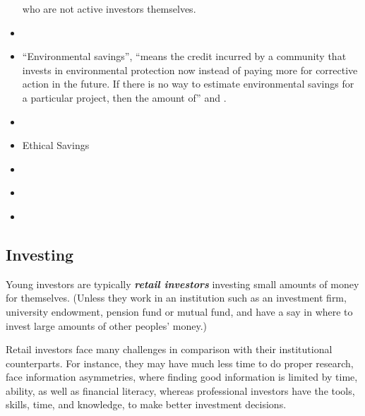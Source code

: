 \documentclass[
  letterpaper,
  DIV=11,
  numbers=noendperiod]{scrartcl}
\begin{document}
\begin{itemize}
  who are not active investors themselves.
\item
  \citet{M1FinanceReview2023}
\item
  ``Environmental savings'', ``means the credit incurred by a community
  that invests in environmental protection now instead of paying more
  for corrective action in the future. If there is no way to estimate
  environmental savings for a particular project, then the amount of''
  \citep[see][]{yalecenterforenvironmentallaw&policyEnvironmentalPerformanceIndex2018}
  and \citep[33]{YalePrincetonStanford}.
\item
  \citet{ENVIRONMENTALSAVINGSDefinition}
\item
  Ethical Savings
\item
  \citet{EthicalSavingsEverything2023}
\item
  \citet{EthicalShopping2019}
\item
  \citet{GoodShoppingGuide}
\end{itemize}

\subsection{Investing}\label{investing}

Young investors are typically \textbf{\emph{retail investors}} investing
small amounts of money for themselves. (Unless they work in an
institution such as an investment firm, university endowment, pension
fund or mutual fund, and have a say in where to invest large amounts of
other peoples' money.)

Retail investors face many challenges in comparison with their
institutional counterparts. For instance, they may have much less time
to do proper research, face information asymmetries, where finding good
information is limited by time, ability, as well as financial literacy,
whereas professional investors have the tools, skills, time, and
knowledge, to make better investment decisions.
\end{document}
